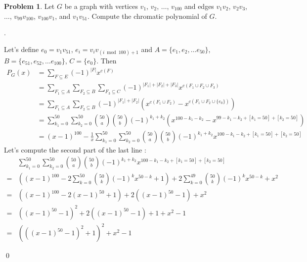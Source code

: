 \documentclass[12pt]{article}
\providecommand{\abs}[1]{\lvert#1\rvert}
\theoremstyle{definition}
\newtheorem{hw}{Problem}
\newenvironment{sol}
  {\par\vspace{3mm}\noindent{\it Solution}.}
  {\qed}
\begin{document}
\begin{hw}
Let $G$ be a graph with vertices $v_1$, $v_2$, $\dots$, $v_{100}$
and edges $v_1v_2$, $v_2v_3$, $\dots$, $v_{99}v_{100}$, $v_{100}v_1$,
and $v_1v_{51}$. Compute the chromatic polynomial of $G$.
\end{hw}

\begin{sol}
	
	\begin{comment}
	Let's define $e_0 = v_1v_{51}$, $e_i = v_iv_{(i \bmod 100) + 1}$ and $A = \{e_1, e_2, \dots e_{50}\}$, $B = \{e_{51}, e_{52}, \dots e_{100} \}$, $C = \{e_0 \}$. Also 
	$$
		P_G(x) = a_0+a_1x+a_2x^2+\cdots+a_nx^n
	$$
	Let's consider what $a_i$ equals to.
	\[
	\begin{split}
		a_i & = \sum_{F \subseteq E  }(-1)^{\abs{F}}[c(F)=i] \\
			& = \sum_{F_1\subseteq A}\sum_{F_2\subseteq B}\sum_{F_3\subseteq C}(-1)^{\abs{F_1}+\abs{F_2}+\abs{F_3}}[c(F_1\cup F_2 \cup F_3)=i] \\
			& = \sum_{F_1\subseteq A}\sum_{F_2\subseteq B}(-1)^{\abs{F_1}+\abs{F_2}}([c(F_1\cup F_2)=i] - [c(F_1\cup F_2 \cup \{e_0\}) = i]) \\
			& = \sum_{a=0}^{50}\sum_{b=0}^{50}\binom{50}{a}\binom{50}{b}(-1)^{a+b}([i = 100 - a - b]-[])
	\end{split}
	\]
	\end{comment}
	
	
	
	
	Let's define $e_0 = v_1v_{51}$, $e_i = v_iv_{(i \bmod 100) + 1}$ and $A = \{e_1, e_2, \dots e_{50}\}$, $B = \{e_{51}, e_{52}, \dots e_{100} \}$, $C = \{e_0 \}$. Then 
	\[ 
	\begin{split}
		P_G(x) & = \sum_{F \subseteq E}(-1)^{\abs{F}}x^{c(F)} 	\\
			   & = \sum_{F_1\subseteq A}\sum_{F_2\subseteq B}\sum_{F_3\subseteq C}(-1)^{\abs{F_1}+\abs{F_2}+\abs{F_3}}x^{c(F_1 \cup F_2 \cup F_3)}	\\
			   & = \sum_{F_1\subseteq A}\sum_{F_2\subseteq B}(-1)^{\abs{F_1}+\abs{F_2}}(x^{c(F_1\cup F_2)} - x^{c(F_1\cup F_2 \cup \{e_0\})}) \\
			   & = \sum_{k_1 = 0}^{50}\sum_{k_2 = 0}^{50}\binom{50}{a}\binom{50}{b}(-1)^{k_1+k_2}(x^{100-k_1-k_2} - x^{99-k_1-k_2+[k_1=50]+[k_2=50]})  \\
			   & = (x-1)^{100} - \frac{1}{x}\sum_{k_1 = 0}^{50}\sum_{k_2 = 0}^{50}\binom{50}{a}\binom{50}{b}(-1)^{k_1+k_2}x^{100-k_1-k_2+[k_1=50]+[k_2=50]}
	\end{split}
	\]
	Let's compute the second part of the last line :
	\[
	\begin{split}
		&\sum_{k_1 = 0}^{50}\sum_{k_2 = 0}^{50}\binom{50}{a}\binom{50}{b}(-1)^{k_1+k_2}x^{100-k_1-k_2+[k_1=50]+[k_2=50]} \\
	  = & ((x-1)^{100} - 2\sum_{k=0}^{50}\binom{50}{k}(-1)^kx^{50-k} + 1) + 2\sum_{k=0}^{49}\binom{50}{k}(-1)^{k}x^{50-k} + x^2 \\
	  = & ((x-1)^{100} - 2(x-1)^{50} + 1)+2((x-1)^{50}-1)+x^2 \\
	  = & ((x-1)^{50}-1)^2+2((x-1)^{50}-1)+1+x^2-1	\\
	  = & (((x-1)^{50}-1)^2+1)^2+x^2-1
	\end{split}
	\]
	

\end{sol}
\end{document}
